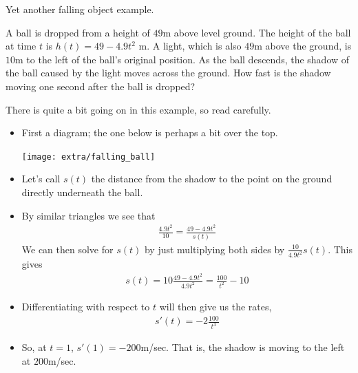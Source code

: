 Yet another falling object example.
\begin{eg}\label{eg:fallingBall}
A ball is dropped from a height of $49$m above level ground. The
height of the ball at time $t$ is $h(t)=49-4.9 t^2$ m. A light,
which is also $49$m above the ground, is $10$m to the left of
the ball's original position. As the ball descends, the shadow
of the ball caused by the light moves across the ground. How
fast is the shadow moving one second after the ball is dropped?

\soln There is quite a bit going on in this example, so read carefully.
\begin{itemize}
 \item First a diagram; the one below is perhaps a bit over the top.
\begin{efig}
\begin{center}
    \texttt{[image: extra/falling\_ball]}
\end{center}
\end{efig}
\item Let's call $s(t)$ the distance from the shadow to the point
on the ground directly underneath the ball.

\item By similar triangles we see that
\begin{align*}
\frac{4.9 t^2}{10}=\frac{49-4.9 t^2}{s(t)}
\end{align*}
We can then solve for $s(t)$ by just multiplying both sides by
$\frac{10}{4.9 t^2}s(t)$. This gives
\begin{align*}
s(t)=10\frac{49-4.9 t^2}{4.9 t^2}=\frac{100}{t^2}-10
\end{align*}
\item Differentiating with respect to $t$ will then give us the rates,
\begin{align*}
s'(t)=-2\frac{100}{t^3}
\end{align*}
\item So, at $t=1$, $s'(1)=-200$m/sec. That is, the shadow is moving
to the left at $200$m/sec.
\end{itemize}

\end{eg}

